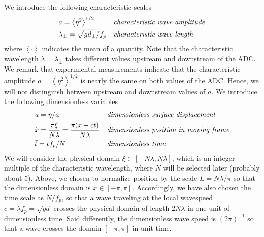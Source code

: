 \documentclass[11pt]{article}
\newcommand{\mean}[1]{\left< #1 \right>}
\newcommand{\freqp}{f_p}
\newcommand{\amp}{a}
\newcommand{\depth}{d}
\newcommand{\dupdn}{\depth_{\pm}}
\newcommand{\lam}{\lambda}
\newcommand{\lamupdn}{\lam_{\pm}}
\newcommand{\lamfac}{N}
\begin{document}
We introduce the following characteristic scales
\begin{align}
\label{ampdefn}
&\amp = \mean{\eta^2}^{1/2} 
&&\mbox{\em characteristic wave amplitude} \\
\label{lamdefn}
&\lamupdn = \sqrt{g \dupdn} / \freqp
&&\mbox{\em characteristic wave length}
\end{align}
where $\mean{\cdot}$ indicates the mean of a quantity. Note that the characteristic wavelength $\lam = \lamupdn$ takes different values upstream and downstream of the ADC. We remark that experimental measurements indicate that the characteristic amplitude $\amp = \mean{\eta^2}^{1/2}$ is nearly the same on both values of the ADC. Hence, we will not distinguish between upstream and downstream values of $\amp$.
We introduce the following dimensionless variables
\begin{align}
&u = \eta/\amp
&&\mbox{\em dimensionless surface displacement} \\
&\tilde{x} = \frac{\pi \xi}{\lamfac \lam} = \frac{\pi (x-ct)}{\lamfac \lam}
&&\mbox{\em dimensionless position in moving frame} \\
& \tilde{t} = t \freqp / \lamfac
&&\mbox{\em dimensionless time}
\end{align}
We will consider the physical domain $\xi \in [-\lamfac \lam, \lamfac \lam]$, which is an integer multiple of the characteristic wavelength, where $\lamfac$ will be selected later (probably about 5). Above, we chosen to normalize position by the scale $L = \lamfac \lam/\pi$ so that the dimensionless domain is $\tilde{x} \in [-\pi,\pi]$. Accordingly, we have also chosen the time scale as $\lamfac/\freqp$, so that a wave traveling at the local wavespeed $c = \lam \freqp = \sqrt{g \depth}$ crosses the physical domain of length $2 \lamfac \lam$ in one unit of dimensionless time. Said differently, the dimensionless wave speed is $(2 \pi)^{-1}$ so that a wave crosses the domain $[-\pi,\pi]$ in unit time.
\end{document}
